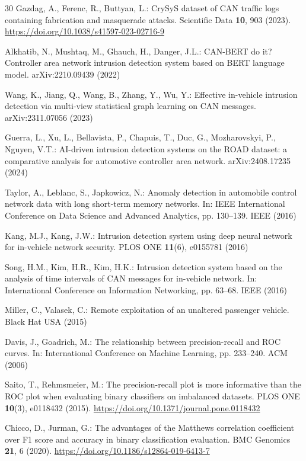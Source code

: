 \documentclass[runningheads]{llncs}%
\providecommand{\doi}[1]{\url{https://doi.org/#1}}
\begin{document}
\begin{thebibliography}{30}
Gazdag, A., Ferenc, R., Buttyan, L.: CrySyS dataset of CAN traffic logs containing fabrication and masquerade attacks. Scientific Data \textbf{10}, 903 (2023). \doi{10.1038/s41597-023-02716-9}

Alkhatib, N., Mushtaq, M., Ghauch, H., Danger, J.L.: CAN-BERT do it? Controller area network intrusion detection system based on BERT language model. arXiv:2210.09439 (2022)

Wang, K., Jiang, Q., Wang, B., Zhang, Y., Wu, Y.: Effective in-vehicle intrusion detection via multi-view statistical graph learning on CAN messages. arXiv:2311.07056 (2023)

Guerra, L., Xu, L., Bellavista, P., Chapuis, T., Duc, G., Mozharovskyi, P., Nguyen, V.T.: AI-driven intrusion detection systems on the ROAD dataset: a comparative analysis for automotive controller area network. arXiv:2408.17235 (2024)

Taylor, A., Leblanc, S., Japkowicz, N.: Anomaly detection in automobile control network data with long short-term memory networks. In: IEEE International Conference on Data Science and Advanced Analytics, pp. 130--139. IEEE (2016)

Kang, M.J., Kang, J.W.: Intrusion detection system using deep neural network for in-vehicle network security. PLOS ONE \textbf{11}(6), e0155781 (2016)

Song, H.M., Kim, H.R., Kim, H.K.: Intrusion detection system based on the analysis of time intervals of CAN messages for in-vehicle network. In: International Conference on Information Networking, pp. 63--68. IEEE (2016)

Miller, C., Valasek, C.: Remote exploitation of an unaltered passenger vehicle. Black Hat USA (2015)

Davis, J., Goadrich, M.: The relationship between precision-recall and ROC curves. In: International Conference on Machine Learning, pp. 233--240. ACM (2006)

Saito, T., Rehmsmeier, M.: The precision-recall plot is more informative than the ROC plot when evaluating binary classifiers on imbalanced datasets. PLOS ONE \textbf{10}(3), e0118432 (2015). \doi{10.1371/journal.pone.0118432}

Chicco, D., Jurman, G.: The advantages of the Matthews correlation coefficient over F1 score and accuracy in binary classification evaluation. BMC Genomics \textbf{21}, 6 (2020). \doi{10.1186/s12864-019-6413-7}


\end{thebibliography}
\end{document}

